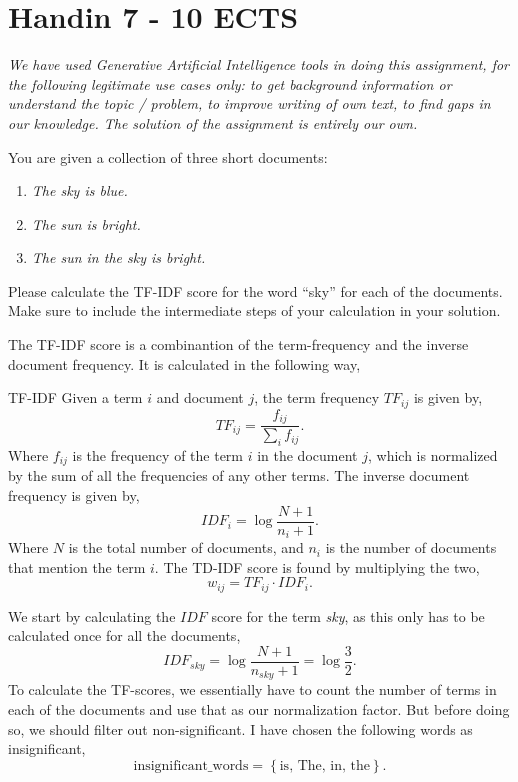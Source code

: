 \documentclass[working, oneside]{../../Preambles/tuftebook}
\begin{document}
\let\cleardoublepage\clearpage
\thispagestyle{fancy}
\chapter{Handin 7 - 10 ECTS}
\textit{We have used Generative Artificial Intelligence tools in doing this
assignment, for the following legitimate use cases only: to get background
information or understand the topic / problem, to improve writing of own
text, to find gaps in our knowledge. The solution of the assignment is
entirely our own.}
\begin{exercise}[a]
You are given a collection of three short documents:
\begin{enumerate}
    \item \textit{The sky is blue.}
    \item \textit{The sun is bright.}
    \item \textit{The sun in the sky is bright.}
\end{enumerate}
Please calculate the TF-IDF score for the word “sky” for each of the documents. Make sure to include the intermediate steps of your calculation in your solution.
\end{exercise}
The TF-IDF score is a combinantion of the term-frequency and the inverse document frequency. It is calculated in the following way,
\begin{SimpleBox}{TF-IDF}
    Given a term $i$ and document $j$, the term frequency $TF_{ij}$ is given by,
    \[
    TF_{ij} = \frac{f_{ij}}{\sum_i f_{ij}}
    .\] 
    Where $f_{ij}$ is the frequency of the term $i$ in the document $j$, which is normalized by the sum of all the frequencies of any other terms. The inverse document frequency is given by,
    \[
    IDF_{i} = \log \frac{N+1}{n_i +1}
    .\] 
    Where $N$ is the total number of documents, and $n_i$ is the number of documents that mention the term $i$. The TD-IDF score is found by multiplying the two,
     \[
    w_{ij} = TF_{ij} \cdot IDF_{i}
    .\] 
\end{SimpleBox}
We start by calculating the $IDF$ score for the term  \textit{sky}, as this only has to be calculated once for all the documents,
\[
IDF_{sky} = \log \frac{N+1}{n_{sky}+1} = \log \frac{3}{2}
.\] 
To calculate the TF-scores, we essentially have to count the number of terms in each of the documents and use that as our normalization factor. But before doing so, we should filter out non-significant. I have chosen the following words as insignificant,
\[
\text{insignificant\_words} = \left\{ \text{is, The, in, the} \right\} 
.\] 
\end{document}
